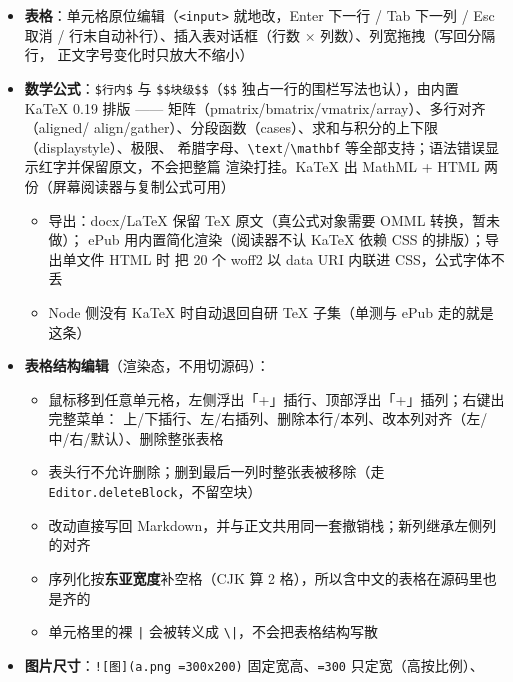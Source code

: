 \documentclass[11pt,a4paper]{ctexart}
\begin{document}
\begin{itemize}
注解 / 预处理指令；\texttt{diff} 按增删行着色，\texttt{markdown} 认标题与行内标记。
右键 \textbf{Code Tools} 八项：复制代码 / 复制为 HTML（带高亮 span）/ 复制为 Markdown /
自动缩进整理 / 切换行注释 / 上移行 / 下移行 / 删除块；\texttt{⌘/} 切行注释、\texttt{⌥↑↓} 移行、
块内选中多行按 \texttt{Tab} / \texttt{⇧Tab} 整段缩进。自动缩进不需要真 parser：先把字符串与注释
抹成等长空格（长度守恒），再按净括号深度重排；Python / YAML 只规范缩进层级不改结构
\item \textbf{表格}：单元格原位编辑（\texttt{\textless{}input\textgreater{}} 就地改，Enter 下一行 / Tab 下一列 /
Esc 取消 / 行末自动补行）、插入表对话框（行数 × 列数）、列宽拖拽（写回分隔行，
正文字号变化时只放大不缩小）
\item \textbf{数学公式}：\texttt{\$行内\$} 与 \texttt{\$\$块级\$\$}（\texttt{\$\$} 独占一行的围栏写法也认），由内置
KaTeX 0.19 排版 —— 矩阵（pmatrix/bmatrix/vmatrix/array）、多行对齐（aligned/
align/gather）、分段函数（cases）、求和与积分的上下限（displaystyle）、极限、
希腊字母、\texttt{\textbackslash{}text}/\texttt{\textbackslash{}mathbf} 等全部支持；语法错误显示红字并保留原文，不会把整篇
渲染打挂。KaTeX 出 MathML + HTML 两份（屏幕阅读器与复制公式可用）
\begin{itemize}
\item 导出：docx/LaTeX 保留 TeX 原文（真公式对象需要 OMML 转换，暂未做）；
ePub 用内置简化渲染（阅读器不认 KaTeX 依赖 CSS 的排版）；导出单文件 HTML 时
把 20 个 woff2 以 data URI 内联进 CSS，公式字体不丢
\item Node 侧没有 KaTeX 时自动退回自研 TeX 子集（单测与 ePub 走的就是这条）
\end{itemize}
\item \textbf{表格结构编辑}（渲染态，不用切源码）：
\begin{itemize}
\item 鼠标移到任意单元格，左侧浮出「+」插行、顶部浮出「+」插列；右键出完整菜单：
上/下插行、左/右插列、删除本行/本列、改本列对齐（左/中/右/默认）、删除整张表格
\item 表头行不允许删除；删到最后一列时整张表被移除（走 \texttt{Editor.deleteBlock}，不留空块）
\item 改动直接写回 Markdown，并与正文共用同一套撤销栈；新列继承左侧列的对齐
\item 序列化按\textbf{东亚宽度}补空格（CJK 算 2 格），所以含中文的表格在源码里也是齐的
\item 单元格里的裸 \texttt{|} 会被转义成 \texttt{\textbackslash{}|}，不会把表格结构写散
\end{itemize}
\item \textbf{图片尺寸}：\texttt{![图](a.png =300x200)} 固定宽高、\texttt{=300} 只定宽（高按比例）、

\end{itemize}
\end{document}
